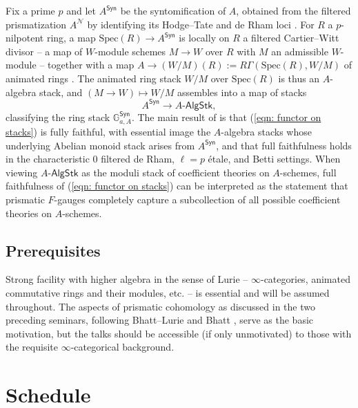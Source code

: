 \documentclass[12pt]{amsart}
\theoremstyle{definition}
\begin{document}
Fix a prime $p$ and let $A^{\mathsf{Syn}}$ be the syntomification of $A$, obtained from the filtered prismatization $A^{\mathcal{N}}$ by identifying its Hodge--Tate and de Rham loci \cite[Rmk. 3.4.2 \& Def. 6.1.1]{Bha22}. For $R$ a $p$-nilpotent ring, a map $\mathrm{Spec}(R)\to A^{\mathsf{Syn}}$ is locally on $R$ a filtered Cartier--Witt divisor \cite[Def. 5.3.1]{Bha22} -- a map of $W$-module schemes $M\to W$ over $R$ with $M$ an admissible $W$-module \cite[Def. 5.2.4]{Bha22} -- together with a map $A\to (W/M)(R):=R\Gamma(\mathrm{Spec}(R),W/M)$ of animated rings \cite[Cor. 5.3.9]{Bha22}. The animated ring stack $W/M$ over $\mathrm{Spec}(R)$ is thus an $A$-algebra stack, and $(M\to W)\mapsto W/M$ assembles into a map of stacks
\begin{equation}\label{eqn: functor on stacks}
    A^{\mathsf{Syn}} \longrightarrow A\mathsf{\text{-}AlgStk},
\end{equation}
classifying the ring stack $\mathbb{G}_{a,A}^{\mathsf{Syn}}$. The main result of \cite{LM25} is that (\ref{eqn: functor on stacks}) is fully faithful, with essential image the $A$-algebra stacks whose underlying Abelian monoid stack arises from $A^{\mathsf{Syn}}$, and that full faithfulness holds in the characteristic 0 filtered de Rham, $\ell=p$ \'{e}tale, and Betti settings. When viewing $A\mathsf{\text{-}AlgStk}$ as the moduli stack of coefficient theories on $A$-schemes, full faithfulness of (\ref{eqn: functor on stacks}) can be interpreted as the statement that prismatic $F$-gauges completely capture a subcollection of all possible coefficient theories on $A$-schemes.

\subsection*{Prerequisites} Strong facility with higher algebra in the sense of Lurie \cite{LurieHTT, LurieHA} -- $\infty$-categories, animated commutative rings and their modules, etc. -- is essential and will be assumed throughout. The aspects of prismatic cohomology as discussed in the two preceding seminars, following Bhatt--Lurie \cite{BL22} and Bhatt \cite{Bha22}, serve as the basic motivation, but the talks should be accessible (if only unmotivated) to those with the requisite $\infty$-categorical background. 

\newpage
\section*{Schedule}
\end{document}
